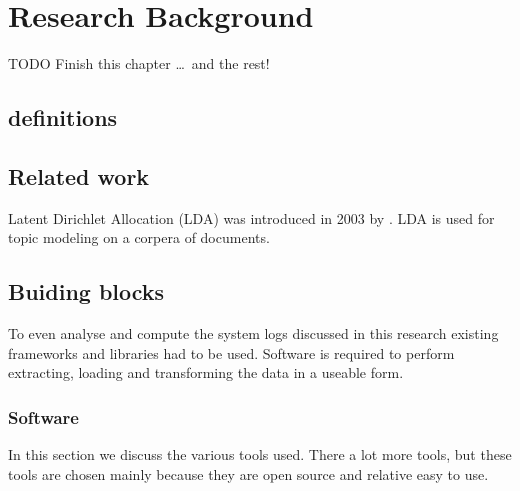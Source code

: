 \chapter{Research Background}  \label{ch:theory}

TODO Finish this chapter \ldots\ and the rest!


\section{definitions}

\section{Related work}  

Latent Dirichlet Allocation (LDA) was introduced in 2003 by \cite{Blei2003LatentAllocation}. LDA is used for topic modeling on a corpera of documents. 

\section{Buiding blocks}
To even analyse and compute the system logs discussed in this research existing frameworks and libraries had to be used. Software is required to perform extracting, loading and transforming the data in a useable form.

\subsection{Software}
In this section we discuss the various tools used. There a lot more tools, but these tools are chosen mainly because they are open source and relative easy to use.

